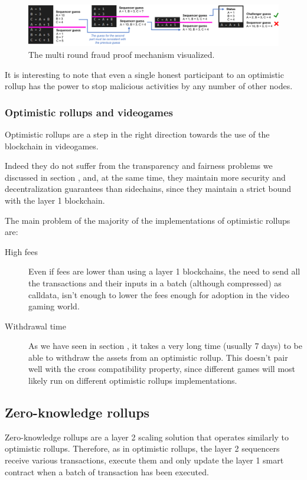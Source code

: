 \documentclass[11pt]{article}
\begin{document}
\begin{figure}[h]
    \centering
    \includegraphics[width=\textwidth]{multi_round_fraud_proof}
    \caption{The multi round fraud proof mechanism visualized.}
    \label{figure:multi_round_fraud_proof}
\end{figure}

It is interesting to note that even a single honest participant to an optimistic rollup has the power to stop malicious activities by any number of other nodes.

\subsubsection{Optimistic rollups and videogames} \label{subsubsection:orav}
Optimistic rollups are a step in the right direction towards the use of the blockchain in videogames.

Indeed they do not suffer from the transparency and fairness problems we discussed in section , and, at the same time, they maintain more security and decentralization guarantees than sidechains, since they maintain a strict bound with the layer 1 blockchain.

The main problem of the majority of the implementations of optimistic rollups are:
\begin{description}
    \item[High fees] Even if fees are lower than using a layer 1 blockchains, the need to send all the transactions and their inputs in a batch (although compressed) as calldata, isn't enough to lower the fees enough for adoption in the video gaming world.
    \item[Withdrawal time] As we have seen in section , it takes a very long time (usually 7 days) to be able to withdraw the assets from an optimistic rollup. This doesn't pair well with the cross compatibility property, since different games will most likely run on different optimistic rollups implementations.
\end{description}

\subsection{Zero-knowledge rollups} \label{subsection:zk_rollups}
Zero-knowledge rollups are a layer 2 scaling solution that operates similarly to optimistic rollups. Therefore, as in optimistic rollups, the layer 2 sequencers receive various transactions, execute them and only update the layer 1 smart contract when a batch of transaction has been executed.
\end{document}
